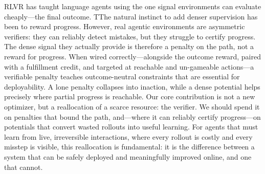 RLVR has taught language agents using the one signal environments can evaluate cheaply---the final outcome. TThe natural instinct to add denser supervision has been to reward progress. However, real agentic environments are asymmetric verifiers: they can reliably detect mistakes, but they struggle to certify progress. The dense signal they actually provide is therefore a penalty on the path, not a reward for progress. When wired correctly---alongside the outcome reward, paired with a fulfillment credit, and targeted at reachable and un-gameable actions---a verifiable penalty teaches outcome-neutral constraints that are essential for deployability. A lone penalty collapses into inaction, while a dense potential helps precisely where partial progress is reachable. Our core contribution is not a new optimizer, but a reallocation of a scarce resource: the verifier. We should spend it on penalties that bound the path, and---where it can reliably certify progress---on potentials that convert wasted rollouts into useful learning. For agents that must learn from live, irreversible interactions, where every rollout is costly and every misstep is visible, this reallocation is fundamental: it is the difference between a system that can be safely deployed and meaningfully improved online, and one that cannot.
